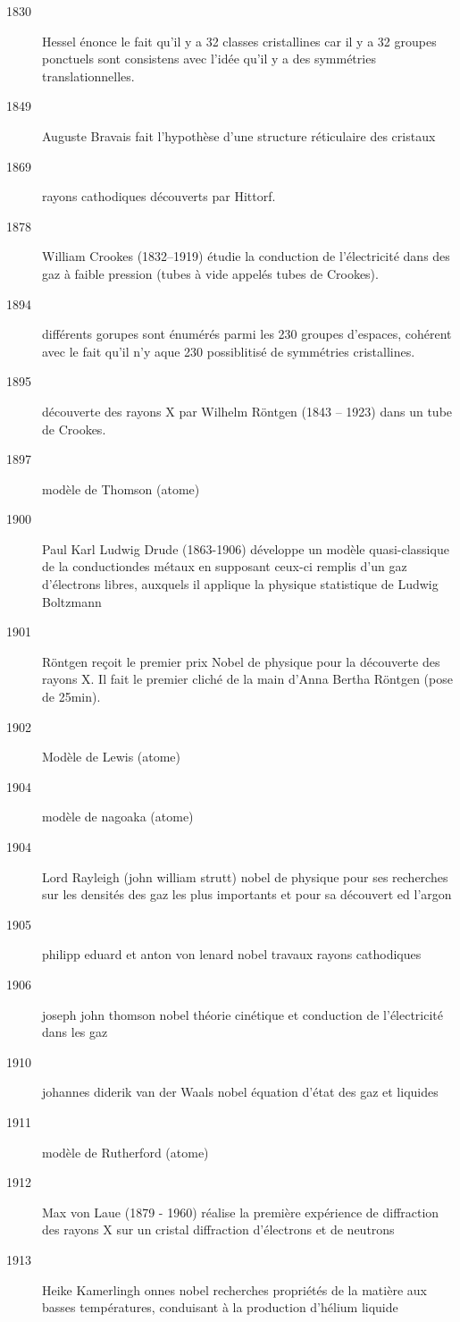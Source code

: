 \begin{description}
\item[1830] Hessel énonce le fait qu'il y a 32 classes cristallines car il y a 32 groupes ponctuels sont consistens avec l'idée qu'il y a des symmétries translationnelles.
\item[1849] Auguste Bravais fait l'hypothèse d'une structure réticulaire des cristaux
\item[1869] rayons cathodiques découverts par Hittorf.
\item[1878] William Crookes (1832--1919) étudie la conduction de l'électricité dans des gaz à faible pression (tubes à vide appelés tubes de Crookes). 
\item[1894] différents gorupes sont énumérés parmi les 230 groupes d'espaces, cohérent avec le fait qu'il n'y aque 230 possiblitisé de symmétries cristallines.
\item[1895] découverte des rayons X par Wilhelm Röntgen (1843 -- 1923) dans un tube de Crookes.
\item[1897] modèle de Thomson (atome)
\item[1900] Paul Karl Ludwig Drude (1863-1906) développe un modèle quasi-classique de la conductiondes métaux en supposant ceux-ci remplis d'un gaz d'électrons libres, auxquels il applique la physique statistique de Ludwig Boltzmann
\item[1901] Röntgen reçoit le premier prix Nobel de physique pour la découverte des rayons X. Il fait le premier cliché de la main d'Anna Bertha Röntgen (pose de 25min).
\item[1902] Modèle de Lewis (atome)
\item[1904] modèle de nagoaka (atome)
\item[1904] Lord Rayleigh (john william strutt) nobel de physique pour ses recherches sur les densités des gaz les plus importants et pour sa découvert ed l'argon
\item[1905] philipp eduard et anton von lenard nobel travaux rayons cathodiques
\item[1906] joseph john thomson nobel théorie cinétique et conduction de l'électricité dans les gaz
\item[1910] johannes diderik van der Waals nobel équation d'état des gaz et liquides
\item[1911] modèle de Rutherford (atome)
\item[1912] Max von Laue (1879 - 1960) réalise la première expérience de diffraction des rayons X sur un cristal
diffraction d'électrons et de neutrons
\item[1913] Heike Kamerlingh onnes nobel recherches propriétés de la matière aux basses températures, conduisant à la production d'hélium liquide

\end{description}
